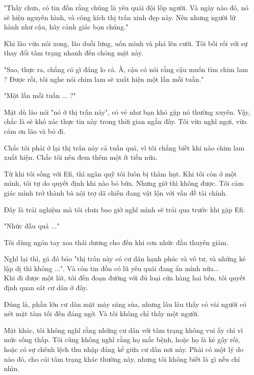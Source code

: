 "Thấy chưa, có tin đồn rằng chúng là yêu quái đội lốp người. Và ngày nào đó, nó sẽ hiện nguyên hình, và công kích thị trấn xinh đẹp này. Nên nhưng người lữ hành như cậu, hãy cảnh giác bọn chúng."

Khi lão vừa nói xong, lão duỗi lưng, uốn mình và phá lên cười. Tôi bối rối với sự thay đổi tâm trạng nhanh đến chóng mặt này.

"Sao, thực ra, chẳng có gì đáng lo cả. À, cậu có nói rằng cậu muốn tìm chim lam ? Được rồi, tôi nghe nói chim lam sẽ xuất hiện một lần mỗi tuần."

"Một lần mỗi tuần ... ?"

Mặt dù lão nói "nó ở thị trấn này", có vẻ như bạn khó gặp nó thường xuyên. Vậy, chắc là sẽ khó xác thực tin này trong thời gian ngắn đây. Tôi vừa nghĩ ngợi, vừa cảm ơn lão và bỏ đi.

Chắc tôi phải ở lại thị trấn này cả tuần quá, vì tôi chẳng biết khi nào chim lam xuất hiện. Chắc tôi nên đem thêm một ít tiền nữa.

Từ khi tôi sống với Efi, thì ngân quỹ tôi luôn bị thâm hụt. Khi tôi còn ở một mình, tôi tự do quyết định khi nào bỏ bữa. Nhưng giờ thì không được. Tôi cảm giác mình trở thành bà nội trợ dã chiến đang vật lộn với vấn đề tài chính.

Đây là trải nghiệm mà tôi chưa bao giờ nghĩ mình sẽ trải qua trước khi gặp Efi.

"Nhức đầu quá ..."

Tôi dùng ngón tay xoa thái dương cho đến khi cơn nhức đầu thuyên giảm.

Nghĩ lại thì, gã đó bảo "thị trấn này có cư dân hạnh phúc và vô tư, và những kẻ lập dị thì không ...". Và còn tin đồn có lũ yêu quái đang ẩn mình nữa...\\


Khi đi được một lát, tôi đến đoạn đường với đủ loại cửa hàng hai bên, tôi quyết định quan sát cư dân ở đây.

Đúng là, phần lớn cư dân mặt mày sáng sủa, nhưng lâu lâu thấy có vài người có nét mặt tâm tối đến đáng ngờ. Và tôi không chỉ thấy một người.

Mặt khác, tôi không nghĩ rằng những cư dân với tâm trạng không vui ấy chỉ vì mức sống thấp. Tôi cũng không nghĩ rằng họ mắc bệnh, hoặc họ là kẻ gây rối, hoặc có sự chênh lệch thu nhập đáng kể giữa cư dân nơi này. Phải có một lý do nào đó, cho cái tâm trạng khác thường này, nhưng tôi không biết là gì nếu chỉ nhìn.

